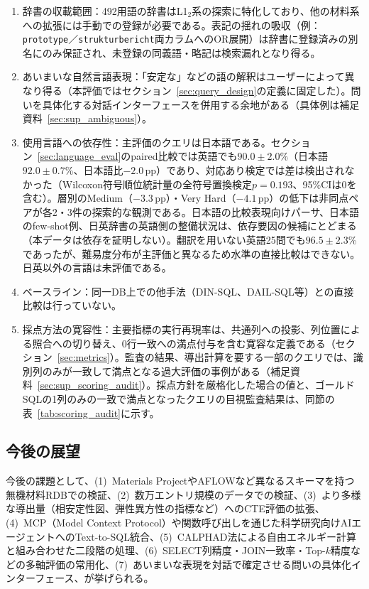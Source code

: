 \documentclass[twocolumn]{interact}
\begin{document}
\begin{enumerate}[nosep]
  \item 辞書の収載範囲：492用語の辞書はL1$_2$系の探索に特化しており、他の材料系への拡張には手動での登録が必要である。表記の揺れの吸収（例：\texttt{prototype}／\texttt{strukturbericht}両カラムへのOR展開）は辞書に登録済みの別名にのみ保証され、未登録の同義語・略記は検索漏れとなり得る。
  \item あいまいな自然言語表現：「安定な」などの語の解釈はユーザーによって異なり得る（本評価ではセクション~\ref{sec:query_design}の定義に固定した）。問いを具体化する対話インターフェースを併用する余地がある（具体例は補足資料~\ref{sec:sup_ambiguous}）。
  \item 使用言語への依存性：主評価のクエリは日本語である。セクション~\ref{sec:language_eval}のpaired比較では英語でも$90.0 \pm 2.0$\%（日本語$92.0 \pm 0.7$\%、日本語比$-2.0$\,pp）であり、対応あり検定では差は検出されなかった（Wilcoxon符号順位統計量の全符号置換検定$p=0.193$、95\%CIは0を含む）。層別のMedium（$-3.3$\,pp）・Very Hard（$-4.1$\,pp）の低下は非同点ペアが各2・3件の探索的な観測である。日本語の比較表現向けパーサ、日本語のfew-shot例、日英辞書の英語側の整備状況は、依存要因の候補にとどまる（本データは依存を証明しない）。翻訳を用いない英語25問でも$96.5 \pm 2.3$\%であったが、難易度分布が主評価と異なるため水準の直接比較はできない。日英以外の言語は未評価である。
  \item ベースライン：同一DB上での他手法（DIN-SQL、DAIL-SQL等）との直接比較は行っていない。
  \item 採点方法の寛容性：主要指標の実行再現率は、共通列への投影、列位置による照合への切り替え、0行一致への満点付与を含む寛容な定義である（セクション~\ref{sec:metrics}）。監査の結果、導出計算を要する一部のクエリでは、識別列のみが一致して満点となる過大評価の事例がある（補足資料~\ref{sec:sup_scoring_audit}）。採点方針を厳格化した場合の値と、ゴールドSQLの1列のみの一致で満点となったクエリの目視監査結果は、同節の表~\ref{tab:scoring_audit}に示す。
\end{enumerate}


\subsection{今後の展望}

今後の課題として、(1)~Materials ProjectやAFLOWなど異なるスキーマを持つ無機材料RDBでの検証、(2)~数万エントリ規模のデータでの検証、(3)~より多様な導出量（相安定性図、弾性異方性の指標など）へのCTE評価の拡張、(4)~MCP（Model Context Protocol）や関数呼び出しを通じた科学研究向けAIエージェントへのText-to-SQL統合、(5)~CALPHAD法による自由エネルギー計算と組み合わせた二段階の処理、(6)~SELECT列精度・JOIN一致率・Top-$k$精度などの多軸評価の常用化、(7)~あいまいな表現を対話で確定させる問いの具体化インターフェース、が挙げられる。
\end{document}
